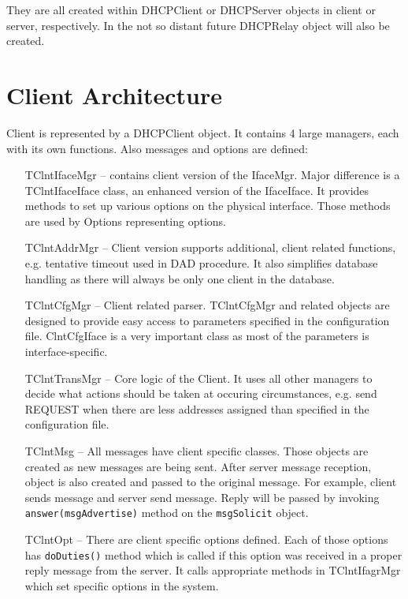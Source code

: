 They are all created within DHCPClient or DHCPServer objects in client
or server, respectively. In the not so distant future DHCPRelay object
will also be created.

\section{Client Architecture}

Client is represented by a DHCPClient object. It contains 4 large
managers, each with its own functions. Also messages and options are
defined:

\begin{itemize}
\item[TClntIfaceMgr] -- contains client version of the IfaceMgr. Major
  difference is a TClntIfaceIface class, an enhanced version of the
  IfaceIface. It provides methods to set up various options on the
  physical interface. Those methods are used by Options representing
  options.
\item[TClntAddrMgr] -- Client version supports additional, client
  related functions, e.g. tentative timeout used in DAD procedure. It
  also simplifies database handling as there will always be only one
  client in the database.
\item[TClntCfgMgr] -- Client related parser. TClntCfgMgr and related
  objects are designed to provide easy access to parameters specified
  in the configuration file. ClntCfgIface is a very important class as
  most of the parameters is interface-specific.
\item[TClntTransMgr] -- Core logic of the Client. It uses all other
  managers to decide what actions should be taken at occuring
  circumstances, e.g. send REQUEST when there are less addresses
  assigned than specified in the configuration file.
\item[TClntMsg] -- All messages have client specific
  classes. Those objects are created as new messages are being
  sent. After server message reception, object is also created and
  passed to the original message. For example, client sends
   message and server send  message. Reply
  will be passed by invoking \verb+answer(msgAdvertise)+ method on the
  \verb+msgSolicit+ object.
\item[TClntOpt] -- There are client specific options defined. Each
  of those options has \verb+doDuties()+ method which is called if this
  option was received in a proper reply message from the server. It
  calls appropriate methods in TClntIfagrMgr which set specific options
  in the system.
\end{itemize}

